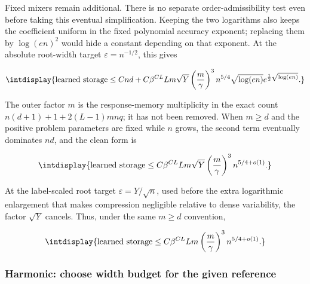 Fixed mixers remain additional. There is no separate order-admissibility test even before taking this eventual simplification. Keeping the two logarithms also keeps the coefficient uniform in the fixed polynomial accuracy exponent; replacing them by \(\log(en)^2\) would hide a constant depending on that exponent. At the absolute root-width target \(\varepsilon=n^{-1/2}\), this gives


\begingroup\renewcommand{\theHequation}{intdisplay.21}
\begin{equation}
\intdisplay{
\text{learned storage}\le Cnd+
C\beta^{CL}Lm\sqrt Y\left(\frac m\gamma\right)^3n^{5/4}
\sqrt{\log(en)}e^{\frac12\sqrt{\log(en)}}.
}
\label{int:eq-0018-legendre-absolute-root-width-storage}
\end{equation}
\endgroup


The outer factor \(m\) is the response-memory multiplicity in the exact count \(n(d+1)+1+2(L-1)mnq\); it has not been removed. When \(m\ge d\) and the positive problem parameters are fixed while \(n\) grows, the second term eventually dominates \(nd\), and the clean form is


\begingroup\renewcommand{\theHequation}{intdisplay.22}
\begin{equation}
\intdisplay{
\text{learned storage}
\le C\beta^{CL}Lm\sqrt Y
\left(\frac m\gamma\right)^3n^{5/4+o(1)}.
}
\label{int:eq-0019-legendre-simplified-root-width-learned-storage}
\end{equation}
\endgroup


At the label-scaled root target \(\varepsilon=Y/\sqrt n\), used before the extra logarithmic enlargement that makes compression negligible relative to dense variability, the factor \(\sqrt Y\) cancels. Thus, under the same \(m\ge d\) convention,


\begingroup\renewcommand{\theHequation}{intdisplay.23}
\begin{equation}
\intdisplay{
\text{learned storage}
\le C\beta^{CL}Lm\left(\frac m\gamma\right)^3n^{5/4+o(1)}.
}
\label{int:eq-0020-legendre-dense-variability-scale-learned-storage}
\end{equation}
\endgroup

\subsubsection{Harmonic: choose width budget for the given reference}


